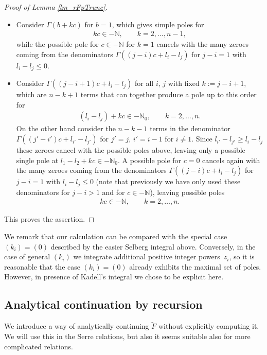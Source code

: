 \documentclass[10pt,a4paper]{amsart}
\numberwithin{equation}{section}
\newcommand{\N}{\mathbb{N}}
\newcommand{\Sel}{\mathrm{Sel}}
\newcommand{\rFp}{\tilde{\mathrm{F}}}
\begin{document}
\begin{proof}[Proof of Lemma \ref{lm_rFpTrunc}]
\begin{itemize}
		We remark that the poles in $\Sel$ depending on $m_i$ must always disappear in $\rFp$, because $\rFp$ is a contour integral avoiding the singularity at $z_i=0$.
		\item Consider $\Gamma(b+kc)$ for $b=1$, which gives simple poles for
		\begin{gather*}
		kc  \in -\N,  \qquad k=2,\dots,n-1,
		\end{gather*}
		while the possible pole for $c\in -\N$ for $k=1$ cancels with the many zeroes coming from the denominators $\Gamma((j-i)c+l_i-l_j)$ for $j-i=1$ with $l_i-l_j\leq 0$.
		\item Consider $\Gamma((j-i+1)c+l_i-l_j)$ for all $i$, $j$ with fixed $k:=j-i+1$, which are $n-k+1$ terms that can together produce a pole up to this order for
		\begin{gather*}
		(l_i-l_j) + kc \in -\N_0, \qquad k=2,\dots,n.
		\end{gather*}
		On the other hand consider the $n-k-1$ terms in the denominator $\Gamma((j'-i')c+l_{i'}-l_{j'})$ for $j'=j$, $i'=i-1$ for $i\neq 1$. Since $l_{i'}-l_{j'}\geq l_i-l_j$ these zeroes cancel with the possible poles above, leaving only a possible single pole at $l_1-l_2+kc\in -\N_0$. A possible pole for $c=0$ cancels again with the many zeroes coming from the denominators $\Gamma((j-i)c+l_i-l_j)$ for $j-i=1$ with $l_i-l_j \leq 0$ (note that previously we have only used these denominators for $j-i>1$ and for $c\in -\N$), leaving possible poles
		\begin{gather*}
		kc \in -\N, \qquad k=2,\dots,n.
		\end{gather*}
	\end{itemize} 	
	This proves the assertion.
\end{proof}

We remark that our calculation can be compared with the special case $(k_i)=(0)$ described by the easier Selberg integral above. Conversely, in the case of general $(k_i)$ we integrate additional positive integer powers~$z_i$, so it is reasonable that the case $(k_i)=(0)$ already exhibits the maximal set of poles. However, in presence of Kadell's integral we chose to be explicit here.

\subsection{Analytical continuation by recursion}\label{sec_recursion}

We introduce a way of analytically continuing $\tilde{F}$ without explicitly computing it. We will use this in the Serre relations, but also it seems suitable also for more complicated relations.
\end{document}
